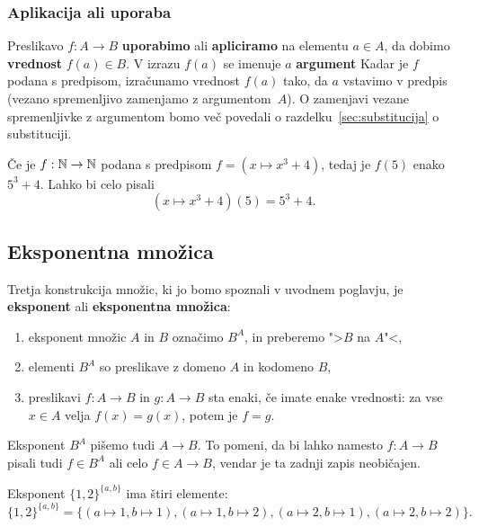 \subsubsection{Aplikacija ali uporaba}

Preslikavo $f : A \to B$ \textbf{uporabimo} ali \textbf{apliciramo} na elementu $a \in A$, da dobimo \textbf{vrednost} $f(a) \in B$. V izrazu $f(a)$ se imenuje $a$ \textbf{argument}
%
Kadar je $f$ podana s predpisom, izračunamo vrednost $f(a)$ tako, da $a$ vstavimo v predpis (vezano spremenljivo zamenjamo z argumentom~$A$).
%
O zamenjavi vezane spremenljivke z argumentom bomo več povedali o razdelku~\ref{sec:substitucija} o substituciji.

\begin{primer}
  Če je $f : \mathbb{N} \to \mathbb{N}$ podana s predpisom $f = (x \mapsto x^3 + 4)$, tedaj je $f(5)$ enako $5^3 + 4$. Lahko bi celo pisali
  \begin{equation*}
    (x \mapsto x^3 + 4)(5) = 5^3 + 4.
  \end{equation*}
\end{primer}


\subsection{Eksponentna množica}

Tretja konstrukcija množic, ki jo bomo spoznali v uvodnem poglavju, je \textbf{eksponent} ali \textbf{eksponentna množica}:
%
\begin{enumerate}
\item eksponent množic $A$ in $B$ označimo $B^A$, in preberemo ">$B$ na $A$"<,
\item elementi $B^A$ so preslikave z domeno $A$ in kodomeno $B$,
\item preslikavi $f : A \to B$ in $g : A \to B$ sta enaki, če imate enake vrednosti: za
  vse $x \in A$ velja $f(x) = g(x)$, potem je $f = g$.
\end{enumerate}
%
Eksponent $B^A$ pišemo tudi $A \to B$. To pomeni, da bi lahko namesto $f : A \to B$ pisali tudi $f \in B^A$ ali celo $f \in A \to B$, vendar je ta zadnji zapis neobičajen.

\begin{primer}
Eksponent $\{1, 2\}^{\{a, b\}}$ ima štiri elemente:
%
\begin{equation*}
  \{1, 2\}^{\{a, b\}} =
  \{
     (a \mapsto 1, b \mapsto 1),
     (a \mapsto 1, b \mapsto 2),
     (a \mapsto 2, b \mapsto 1),
     (a \mapsto 2, b \mapsto 2)
  \}.
\end{equation*}
\end{primer}


